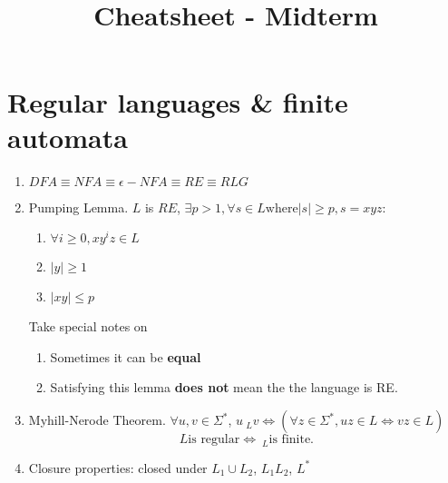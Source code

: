 \documentclass{article}
\title{
    \vspace{-0.8in}
    \textmd{\textbf{\class \\ Cheatsheet - Midterm}}\\
}
\author{\authorName}
\date{}
\newcommand{\U}{\Sigma^*}
\begin{document}
\maketitle

\begin{comment}
\setcounter{section}{-1}
\section{Introduction}\begin{enumerate}
	\item Proof ideas are important? Too lazy to list them out...
\end{enumerate}
\end{comment}


\section{Regular languages \& finite automata}\begin{enumerate}
	\item $DFA \equiv NFA \equiv \epsilon-NFA \equiv RE \equiv RLG$
	\item Pumping Lemma. $L$ is $RE$, $\exists p > 1, \forall s \in L \text{where} |s| \ge p, s = xyz$:
	\begin{enumerate}
		\item $\forall i \ge 0, xy^iz \in L$
		\item $|y| \ge 1$
		\item $|xy| \le p$
	\end{enumerate}
	Take special notes on
	\begin{enumerate}
		\item Sometimes it can be \textbf{equal}
		\item Satisfying this lemma \textbf{does not} mean the the language is RE.
	\end{enumerate} 
	\item Myhill-Nerode Theorem. $\forall u, v\in \U$, $u ~_L v \Longleftrightarrow (\forall z \in \U, uz \in L \Leftrightarrow vz \in L)$ \\
	$$L \text{is regular} \Longleftrightarrow ~_L \text{is finite.} $$
	\item Closure properties: closed under $L_1 \cup L_2$, $L_1L_2$, $L^*$
\end{enumerate}
\end{document}

